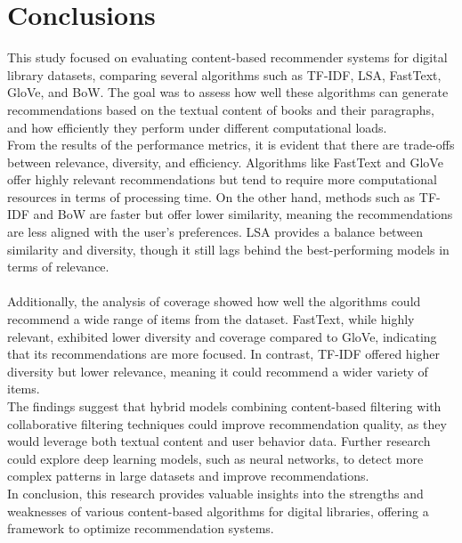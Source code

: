 \documentclass{llncs}
\begin{document}
\section{Conclusions}
This study focused on evaluating content-based recommender systems for digital library datasets, comparing several algorithms such as TF-IDF, LSA, FastText, GloVe, and BoW. The goal was to assess how well these algorithms can generate recommendations based on the textual content of books and their paragraphs, and how efficiently they perform under different computational loads.\\
From the results of the performance metrics, it is evident that there are trade-offs between relevance, diversity, and efficiency. Algorithms like FastText and GloVe offer highly relevant recommendations but tend to require more computational resources in terms of processing time. On the other hand, methods such as TF-IDF and BoW are faster but offer lower similarity, meaning the recommendations are less aligned with the user’s preferences. LSA provides a balance between similarity and diversity, though it still lags behind the best-performing models in terms of relevance.\\\\
Additionally, the analysis of coverage showed how well the algorithms could recommend a wide range of items from the dataset. FastText, while highly relevant, exhibited lower diversity and coverage compared to GloVe, indicating that its recommendations are more focused. In contrast, TF-IDF offered higher diversity but lower relevance, meaning it could recommend a wider variety of items.\\
The findings suggest that hybrid models combining content-based filtering with collaborative filtering techniques could improve recommendation quality, as they would leverage both textual content and user behavior data. Further research could explore deep learning models, such as neural networks, to detect more complex patterns in large datasets and improve recommendations.\\
In conclusion, this research provides valuable insights into the strengths and weaknesses of various content-based algorithms for digital libraries, offering a framework to optimize recommendation systems. \\\\
\end{document}
